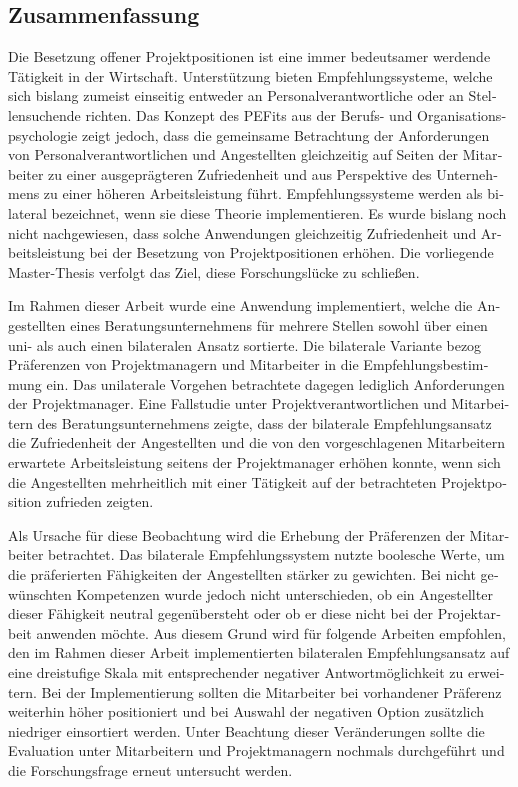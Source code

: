 \begin{otherlanguage}{ngerman}
\chapter*{Zusammenfassung}
Die Besetzung offener Projektpositionen ist eine immer bedeutsamer werdende Tätigkeit in der Wirtschaft. Unterstützung bieten Empfehlungssysteme, welche sich bislang zumeist einseitig entweder an Personalverantwortliche oder an Stellensuchende richten. Das Konzept des \aclp{PEFit} aus der Berufs- und Organisationspsychologie zeigt jedoch, dass die gemeinsame Betrachtung der Anforderungen von Personalverantwortlichen und Angestellten gleichzeitig auf Seiten der Mitarbeiter zu einer ausgeprägteren Zufriedenheit und aus Perspektive des Unternehmens zu einer höheren Arbeitsleistung führt. Empfehlungssysteme werden als bilateral bezeichnet, wenn sie diese Theorie implementieren. Es wurde bislang noch nicht nachgewiesen, dass solche Anwendungen gleichzeitig Zufriedenheit und Arbeitsleistung bei der Besetzung von Projektpositionen erhöhen. Die vorliegende Master-Thesis verfolgt das Ziel, diese Forschungslücke zu schließen.

Im Rahmen dieser Arbeit wurde eine Anwendung implementiert, welche die Angestellten eines Beratungsunternehmens für mehrere Stellen sowohl über einen uni- als auch einen bilateralen Ansatz sortierte. Die bilaterale Variante bezog Präferenzen von Projektmanagern und Mitarbeiter in die Empfehlungsbestimmung ein. Das unilaterale Vorgehen betrachtete dagegen lediglich Anforderungen der Projektmanager. Eine Fallstudie unter Projektverantwortlichen und Mitarbeitern des Beratungsunternehmens zeigte, dass der bilaterale Empfehlungsansatz die Zufriedenheit der Angestellten und die von den vorgeschlagenen Mitarbeitern erwartete Arbeitsleistung seitens der Projektmanager erhöhen konnte, wenn sich die Angestellten mehrheitlich mit einer Tätigkeit auf der betrachteten Projektposition zufrieden zeigten.

Als Ursache für diese Beobachtung wird die Erhebung der Präferenzen der Mitarbeiter betrachtet. Das bilaterale Empfehlungssystem nutzte boolesche Werte, um die präferierten Fähigkeiten der Angestellten stärker zu gewichten. Bei nicht gewünschten Kompetenzen wurde jedoch nicht unterschieden, ob ein Angestellter dieser Fähigkeit neutral gegenübersteht oder ob er diese nicht bei der Projektarbeit anwenden möchte. Aus diesem Grund wird für folgende Arbeiten empfohlen, den im Rahmen dieser Arbeit implementierten bilateralen Empfehlungsansatz auf eine dreistufige Skala mit entsprechender negativer Antwortmöglichkeit zu erweitern. Bei der Implementierung sollten die Mitarbeiter bei vorhandener Präferenz weiterhin höher positioniert und bei Auswahl der negativen Option zusätzlich niedriger einsortiert werden. Unter Beachtung dieser Veränderungen sollte die Evaluation unter Mitarbeitern und Projektmanagern nochmals durchgeführt und die Forschungsfrage erneut untersucht werden.
\end{otherlanguage}

